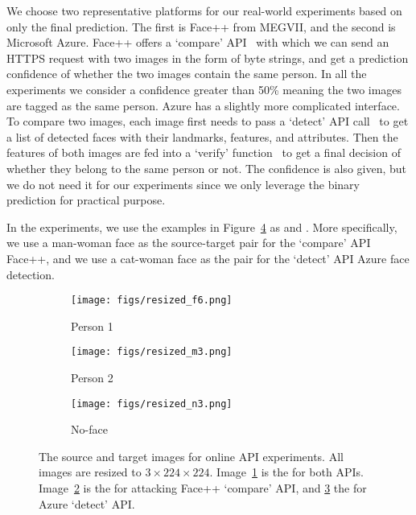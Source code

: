 We choose two representative platforms for our real-world experiments based on only the final prediction. The first is Face++ from MEGVII\cite{facepp-compare-api}, and the second is Microsoft Azure\cite{azure-detect-api}. Face++ offers a `compare' API~\cite{facepp-compare-api} with which we can send an HTTPS request with two images in the form of byte strings, and get a prediction confidence of whether the two images contain the same person. In all the experiments we consider a confidence greater than 50\% meaning the two images are tagged as the same person. Azure has a slightly more complicated interface. To compare two images, each image first needs to pass a `detect' API call~\cite{azure-detect-api} to get a list of detected faces with their landmarks, features, and attributes. Then the features of both images are fed into a `verify' function~\cite{azure-verify-api} to get a final decision of whether they belong to the same person or not. The confidence is also given, but we do not need it for our experiments since we only leverage the binary prediction for practical purpose.

In the experiments, we use the examples in Figure~\ref{fig:src_tgt_imgs} as \sourceimage and \targetimage. More specifically, we use a man-woman face as the source-target pair for the `compare' API Face++, and we use a cat-woman face as the pair for the `detect' API Azure face detection.


\begin{figure}
\centering
\begin{subfigure}[t]{.28\linewidth}
  \centering
  \texttt{[image: figs/resized\_f6.png]}
  \caption{Person 1}
  \label{fig:tgt_img}
\end{subfigure}
\begin{subfigure}[t]{.28\linewidth}
  \centering
  \texttt{[image: figs/resized\_m3.png]}
  \caption{Person 2}
  \label{fig:src_img_facepp}
\end{subfigure}
\begin{subfigure}[t]{.28\linewidth}
  \centering
  \texttt{[image: figs/resized\_n3.png]}
  \caption{No-face}
  \label{fig:src_img_azure}
\end{subfigure}
\caption{
The source and target images for online API experiments. All images are resized to $3\times 224\times 224$. 
Image~\ref{fig:tgt_img} is the \targetimage for both APIs. Image~\ref{fig:src_img_facepp} is the \sourceimage for attacking Face++ `compare' API, and \ref{fig:src_img_azure} the \sourceimage for Azure `detect' API. }
\label{fig:src_tgt_imgs}
\end{figure}


